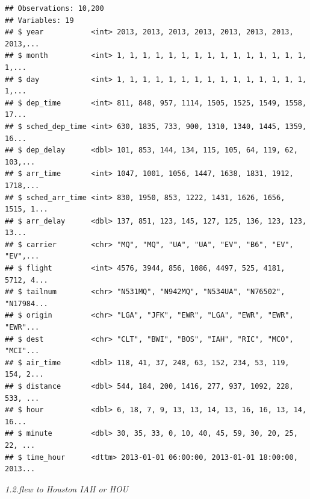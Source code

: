 \documentclass[]{book}
\newenvironment{Shaded}{\begin{snugshade}}{\end{snugshade}}
\newcommand{\KeywordTok}[1]{\textcolor[rgb]{0.13,0.29,0.53}{\textbf{#1}}}
\newcommand{\NormalTok}[1]{#1}
\newcommand{\OperatorTok}[1]{\textcolor[rgb]{0.81,0.36,0.00}{\textbf{#1}}}
\newcommand{\StringTok}[1]{\textcolor[rgb]{0.31,0.60,0.02}{#1}}
\theoremstyle{definition}
\theoremstyle{definition}
\theoremstyle{definition}
\theoremstyle{remark}
\begin{document}
\begin{verbatim}
## Observations: 10,200
## Variables: 19
## $ year           <int> 2013, 2013, 2013, 2013, 2013, 2013, 2013, 2013,...
## $ month          <int> 1, 1, 1, 1, 1, 1, 1, 1, 1, 1, 1, 1, 1, 1, 1, 1,...
## $ day            <int> 1, 1, 1, 1, 1, 1, 1, 1, 1, 1, 1, 1, 1, 1, 1, 1,...
## $ dep_time       <int> 811, 848, 957, 1114, 1505, 1525, 1549, 1558, 17...
## $ sched_dep_time <int> 630, 1835, 733, 900, 1310, 1340, 1445, 1359, 16...
## $ dep_delay      <dbl> 101, 853, 144, 134, 115, 105, 64, 119, 62, 103,...
## $ arr_time       <int> 1047, 1001, 1056, 1447, 1638, 1831, 1912, 1718,...
## $ sched_arr_time <int> 830, 1950, 853, 1222, 1431, 1626, 1656, 1515, 1...
## $ arr_delay      <dbl> 137, 851, 123, 145, 127, 125, 136, 123, 123, 13...
## $ carrier        <chr> "MQ", "MQ", "UA", "UA", "EV", "B6", "EV", "EV",...
## $ flight         <int> 4576, 3944, 856, 1086, 4497, 525, 4181, 5712, 4...
## $ tailnum        <chr> "N531MQ", "N942MQ", "N534UA", "N76502", "N17984...
## $ origin         <chr> "LGA", "JFK", "EWR", "LGA", "EWR", "EWR", "EWR"...
## $ dest           <chr> "CLT", "BWI", "BOS", "IAH", "RIC", "MCO", "MCI"...
## $ air_time       <dbl> 118, 41, 37, 248, 63, 152, 234, 53, 119, 154, 2...
## $ distance       <dbl> 544, 184, 200, 1416, 277, 937, 1092, 228, 533, ...
## $ hour           <dbl> 6, 18, 7, 9, 13, 13, 14, 13, 16, 16, 13, 14, 16...
## $ minute         <dbl> 30, 35, 33, 0, 10, 40, 45, 59, 30, 20, 25, 22, ...
## $ time_hour      <dttm> 2013-01-01 06:00:00, 2013-01-01 18:00:00, 2013...
\end{verbatim}

\emph{1.2.flew to Houston IAH or HOU}

\begin{Shaded}
\end{Shaded}
\end{document}
